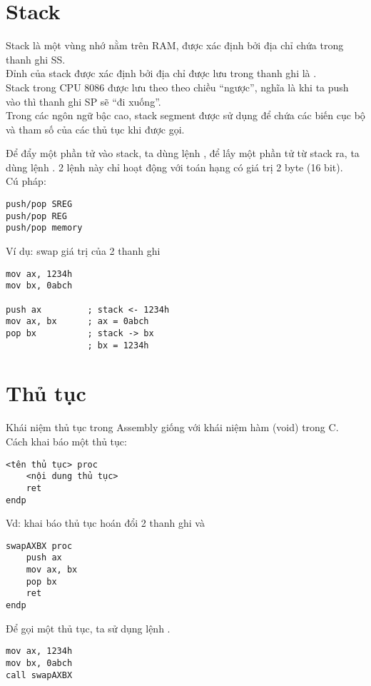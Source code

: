 \documentclass[main.tex]{subfiles}
\begin{document}
\section{Stack} \label{sec:stack}
Stack là một vùng nhớ nằm trên RAM, được xác định bởi địa chỉ chứa trong thanh ghi SS.\\
Đỉnh của stack được xác định bởi địa chỉ được lưu trong thanh ghi  là .\\
Stack trong CPU 8086 được lưu theo theo chiều ``ngược'', nghĩa là khi ta push vào thì thanh ghi SP sẽ ``đi xuống''.\\
Trong các ngôn ngữ bậc cao, stack segment được sử dụng để chứa các biến cục bộ và tham số của các thủ tục khi được gọi.\bigskip

Để đẩy một phần tử vào stack, ta dùng lệnh , để lấy một phần tử từ stack ra, ta dùng lệnh . 2 lệnh này chỉ hoạt động với toán hạng có giá trị 2 byte (16 bit).\\
Cú pháp:
\begin{verbatim}
push/pop SREG 
push/pop REG 
push/pop memory 
\end{verbatim}

Ví dụ: swap giá trị của 2 thanh ghi 
\begin{verbatim}
mov ax, 1234h
mov bx, 0abch

push ax         ; stack <- 1234h 
mov ax, bx      ; ax = 0abch
pop bx          ; stack -> bx 
                ; bx = 1234h
\end{verbatim}

\section{Thủ tục} \label{sec:thutuc}
Khái niệm thủ tục trong Assembly giống với khái niệm hàm (void) trong C.\\
Cách khai báo một thủ tục:
\begin{verbatim}
<tên thủ tục> proc 
    <nội dung thủ tục>
    ret
endp
\end{verbatim}

Vd: khai báo thủ tục hoán đổi 2 thanh ghi  và 
\begin{verbatim}
swapAXBX proc 
    push ax 
    mov ax, bx
    pop bx
    ret
endp
\end{verbatim}

Để gọi một thủ tục, ta sử dụng lệnh .
\begin{verbatim}
mov ax, 1234h
mov bx, 0abch
call swapAXBX 
\end{verbatim}
\end{document}
